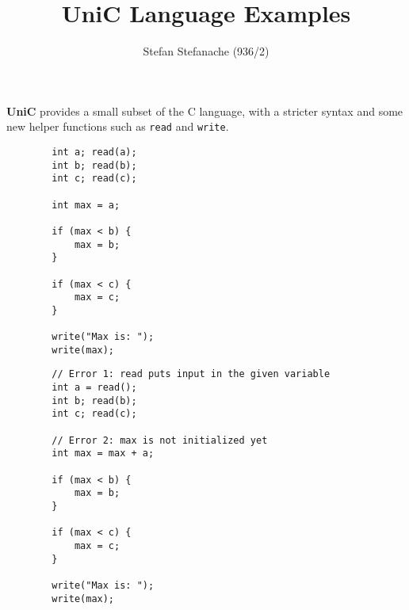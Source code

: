 \documentclass{article}[12pt]
\title{\textbf{UniC Language Examples}}
\author{Stefan Stefanache (936/2)}
\date{}
\begin{document}
    \maketitle

    \textbf{UniC} provides a small subset of the C language, with a stricter
    syntax and some new helper functions such as \texttt{read} and \texttt{write}.

    \begin{tcolorbox}[
        standard jigsaw,
        title=P1. Compute the maximum of 3 numbers,
        opacityback=0]
    \begin{verbatim}
        int a; read(a);
        int b; read(b);
        int c; read(c);

        int max = a;

        if (max < b) {
            max = b;
        }

        if (max < c) {
            max = c;
        }

        write("Max is: ");
        write(max);
    \end{verbatim}
    \end{tcolorbox}

    \begin{tcolorbox}[
        standard jigsaw,
        title=\textbf{ERR\_P1. Compute the maximum of 3 numbers (with 2 errors)},
        colframe=red,
        coltitle=black,
        opacityback=0]
    \begin{verbatim}
        // Error 1: read puts input in the given variable
        int a = read();
        int b; read(b);
        int c; read(c);

        // Error 2: max is not initialized yet
        int max = max + a; 

        if (max < b) {
            max = b;
        }

        if (max < c) {
            max = c;
        }

        write("Max is: ");
        write(max);
    \end{verbatim}
    \end{tcolorbox}
\end{document}
